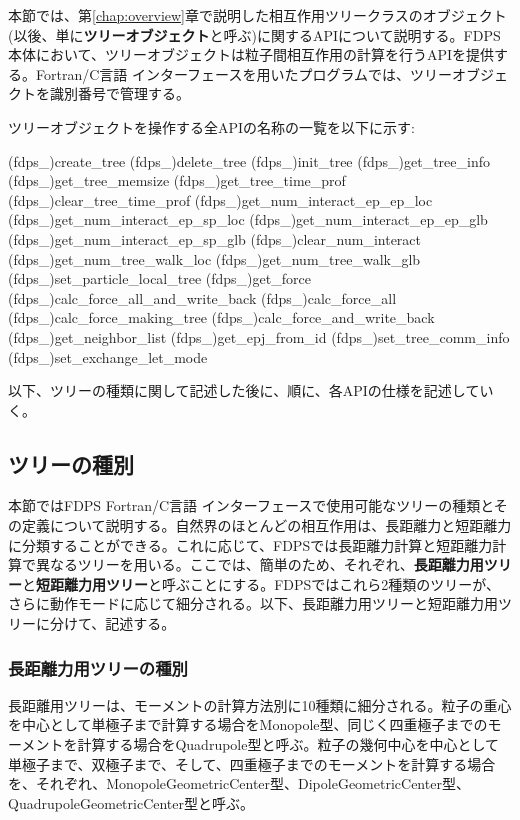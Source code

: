 \newcommand{\tlap}[1]{\vbox to 0pt{\vss\hbox{#1}}}
\newcommand{\blap}[1]{\vbox to 0pt{\hbox{#1}\vss}}

本節では、第\ref{chap:overview}章で説明した相互作用ツリークラスのオブジェクト(以後、単に\textbf{ツリーオブジェクト}と呼ぶ)に関するAPIについて説明する。FDPS本体において、ツリーオブジェクトは粒子間相互作用の計算を行うAPIを提供する。Fortran/C言語 インターフェースを用いたプログラムでは、ツリーオブジェクトを識別番号で管理する。

ツリーオブジェクトを操作する全APIの名称の一覧を以下に示す:
\begin{screen}
\begin{spverbatim}
(fdps_)create_tree
(fdps_)delete_tree
(fdps_)init_tree
(fdps_)get_tree_info
(fdps_)get_tree_memsize
(fdps_)get_tree_time_prof
(fdps_)clear_tree_time_prof
(fdps_)get_num_interact_ep_ep_loc
(fdps_)get_num_interact_ep_sp_loc
(fdps_)get_num_interact_ep_ep_glb
(fdps_)get_num_interact_ep_sp_glb
(fdps_)clear_num_interact
(fdps_)get_num_tree_walk_loc
(fdps_)get_num_tree_walk_glb
(fdps_)set_particle_local_tree
(fdps_)get_force
(fdps_)calc_force_all_and_write_back
(fdps_)calc_force_all
(fdps_)calc_force_making_tree
(fdps_)calc_force_and_write_back
(fdps_)get_neighbor_list
(fdps_)get_epj_from_id
(fdps_)set_tree_comm_info
(fdps_)set_exchange_let_mode  
\end{spverbatim}  
\end{screen}

以下、ツリーの種類に関して記述した後に、順に、各APIの仕様を記述していく。
\clearpage

\subsection{ツリーの種別}
本節ではFDPS Fortran/C言語 インターフェースで使用可能なツリーの種類とその定義について説明する。自然界のほとんどの相互作用は、長距離力と短距離力に分類することができる。これに応じて、FDPSでは長距離力計算と短距離力計算で異なるツリーを用いる。ここでは、簡単のため、それぞれ、\textbf{長距離力用ツリー}と\textbf{短距離力用ツリー}と呼ぶことにする。FDPSではこれら2種類のツリーが、さらに動作モードに応じて細分される。以下、長距離力用ツリーと短距離力用ツリーに分けて、記述する。

\subsubsection{長距離力用ツリーの種別}
\label{subsubsec:tree_kinds_long}
長距離用ツリーは、モーメントの計算方法別に10種類に細分される。粒子の重心を中心として単極子まで計算する場合をMonopole型、同じく四重極子までのモーメントを計算する場合をQuadrupole型と呼ぶ。粒子の幾何中心を中心として単極子まで、双極子まで、そして、四重極子までのモーメントを計算する場合を、それぞれ、MonopoleGeometricCenter型、DipoleGeometricCenter型、QuadrupoleGeometricCenter型と呼ぶ。

